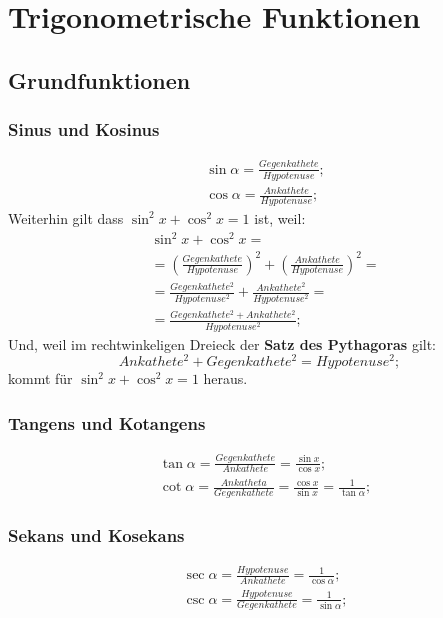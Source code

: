 \documentclass[a4paper]{article}
\begin{document}
\section{Trigonometrische Funktionen}

\subsection{Grundfunktionen}

\subsubsection{Sinus und Kosinus}
\begin{align*}
	&\sin{\alpha} = \frac{Gegenkathete}{Hypotenuse} ;
	\\
	&\cos{\alpha} = \frac{Ankathete}{Hypotenuse} ;
\end{align*}
Weiterhin gilt dass $ \sin^2{x} + \cos^2{x} = 1 $ ist, weil:
\begin{align*}
	& \sin^2{x} + \cos^2{x} = \\
	& = \left( \frac{Gegenkathete}{Hypotenuse} \right) ^2 + \left( \frac{Ankathete}{Hypotenuse} \right) ^ 2 = \\
	& = \frac{Gegenkathete^2}{Hypotenuse^2} + \frac{Ankathete^2}{Hypotenuse^2} = \\
	& = \frac{Gegenkathete^2 + Ankathete^2}{Hypotenuse^2} ;
\end{align*}
Und, weil im rechtwinkeligen Dreieck der \textbf{Satz des Pythagoras} gilt:
\[
Ankathete^2 + Gegenkathete^2 = Hypotenuse^2 ;
\]
kommt für $ \sin^2{x} + \cos^2{x} = 1 $ heraus.

\subsubsection{Tangens und Kotangens}
\begin{align*}
	&\tan{\alpha} = \frac{Gegenkathete}{Ankathete} = \frac{\sin{x}}{\cos{x}} ;
	\\
	&\cot{\alpha} = \frac{Ankatheta}{Gegenkathete} = \frac{\cos{x}}{\sin{x}} = \frac{1}{\tan{\alpha}} ;
\end{align*}

\subsubsection{Sekans und Kosekans}
\begin{align*}
	&\sec{\alpha} = \frac{Hypotenuse}{Ankathete} = \frac{1}{\cos{\alpha}} ;
	\\
	&\csc{\alpha} = \frac{Hypotenuse}{Gegenkathete} = \frac{1}{\sin{\alpha}} ;
\end{align*}
\end{document}
